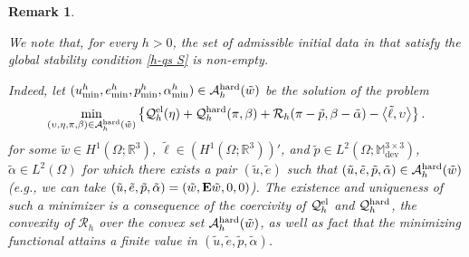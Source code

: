 \documentclass[reqno,10pt]{amsart}
\numberwithin{equation}{section}
\newtheorem{remark}[theorem]{Remark}
\theoremstyle{remark}
\newcommand{\PINK}{\color{black}}
\newcommand{\calA}{\mathcal{A}}
\newcommand{\M}{\mathbb{M}}
\newcommand{\calQ}{\mathcal{Q}}
\newcommand{\R}{\mathbb{R}}
\newcommand{\calR}{\mathcal{R}}
\DeclareMathOperator{\dev}{dev}
\DeclareMathOperator*{\argmin}{Arg\,min}
\newcommand{\E}{{\bf E}}
\begin{document}
\begin{remark} \label{remark stable states} 
{\PINK
We note that, for every $h > 0$, the set of admissible initial data in  that satisfy the global stability condition \ref{h-qs S} is non-empty.

Indeed, let $(u^h_{\rm min}, e^h_{\rm min}, p^h_{\rm min}, \alpha^h_{\rm min}) \in \calA_{h}^{\rm hard}(\tilde{w})$ be the solution of the problem 
\[
	\min_{(\upsilon, \eta, \pi, \beta) \in \calA_{h}^{\rm hard}(\tilde{w})}
	\left\{ 
	\calQ^{\rm el}_{h}(\eta) + \calQ^{\rm hard}_{h}(\pi, \beta) + \calR_{h}(\pi - \tilde{p}, \beta - \tilde{\alpha}) - \big\langle \tilde{\ell}, \upsilon  \big\rangle 
	\right\}.
\]
for some $\tilde{w} \in H^1(\Omega;\R^3)$, $\tilde{\ell} \in (H^1(\Omega;\R^3))'$, and $\tilde{p} \in L^2(\Omega;\M^{3 \times 3}_{\dev})$, $\tilde{\alpha} \in L^2(\Omega)$ for which there exists a pair $(\tilde{u}, \tilde{e})$ such that $(\tilde{u}, \tilde{e}, \tilde{p}, \tilde{\alpha}) \in \calA_{h}^{\rm hard}(\tilde{w})$ (e.g., we can take $(\tilde{u}, \tilde{e}, \tilde{p}, \tilde{\alpha}) = (\tilde{w}, {\E}\tilde{w}, 0,0)$).  
The existence and uniqueness of such a minimizer is a consequence of the coercivity of $\calQ^{\rm el}_{h}$ and $\calQ^{\rm hard}_{h}$, the convexity of $\calR_{h}$ over the convex set $\calA_{h}^{\rm hard}(\tilde{w})$, as well as fact that the minimizing functional attains a finite value in $(\tilde{u}, \tilde{e}, \tilde{p}, \tilde{\alpha})$.

}
\end{remark}
\end{document}
